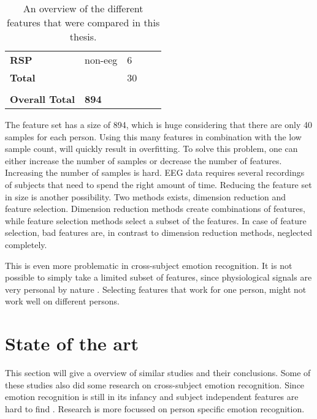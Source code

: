 \begin{table}[]
\begin{tabular}{lllll}
\textbf{RSP}            & non-eeg       & 6                             &                           &              \\
\textbf{Total}          &               & 30                            &                           &              \\
                        &               &                               &                           &              \\
\textbf{Overall Total}  & \textbf{894}  &                               &                           &             
\end{tabular}
\caption{An overview of the different features that were compared in this thesis.\label{featOverviewTable}}
\end{table}

The feature set has a size of 894, which is huge considering that there are only 40 samples for each person. Using this many features in combination with the low sample count, will quickly result in overfitting\citep{prml}. To solve this problem, one can either increase the number of samples or decrease the number of features. Increasing the number of samples is hard. EEG data requires several recordings of subjects that need to spend the right amount of time. Reducing the feature set in size is another possibility. Two methods exists, dimension reduction and feature selection. Dimension reduction methods create combinations of features, while feature selection methods select a subset of the features. In case of feature selection, bad features are, in contrast to dimension reduction methods, neglected completely. %

\npar

This is even more problematic in cross-subject emotion recognition. It is not possible to simply take a limited subset of features, since physiological signals are very personal by nature \citep{DEAP}. Selecting features that work for one person, might not work well on different persons.


\section{State of the art}
This section will give a overview of similar studies and their conclusions. Some of these studies also did some research on cross-subject emotion recognition. Since emotion recognition is still in its infancy\citep{emorecoghard} and subject independent features are hard to find \citep{DEAP}. Research is more focussed on person specific emotion recognition.

